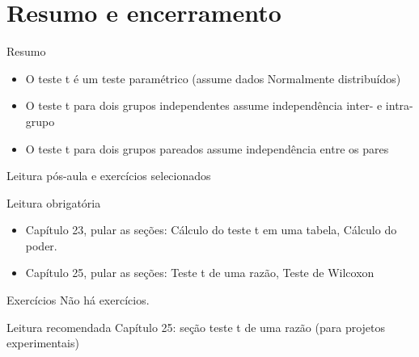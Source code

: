 \documentclass{beamer}
\begin{document}

\section{Resumo e encerramento}

\begin{frame}{Resumo}
  \begin{itemize}
  \item O teste t é um teste paramétrico (assume dados Normalmente distribuídos)
  \item O teste t para dois grupos independentes assume independência inter- e intra-grupo
  \item O teste t para dois grupos pareados assume independência entre os pares
  \end{itemize}
\end{frame}

\begin{frame}{Leitura pós-aula e exercícios selecionados}
  \begin{block}{Leitura obrigatória}
    \begin{itemize}
    \item Capítulo 23, pular as seções: Cálculo do teste t em uma tabela, Cálculo do poder.
    \item Capítulo 25, pular as seções: Teste t de uma razão, Teste de Wilcoxon
    \end{itemize}
  \end{block}
  \begin{block}{Exercícios}
    Não há exercícios.
  \end{block}
  \begin{block}{Leitura recomendada}
    Capítulo 25: seção teste t de uma razão (para projetos experimentais)
  \end{block}
\end{frame}
\end{document}
